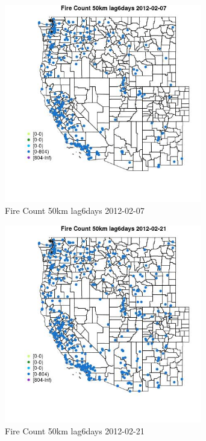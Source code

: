 \begin{figure} 
\centering  
\includegraphics[width=0.77\textwidth]{Code_Outputs/Report_ML_input_PM25_Step4_part_f_de_duplicated_aves_prioritize_24hr_obswNAs_MapObsFire_Count_50km_lag6days2012-02-07.jpg} 
\caption{\label{fig:Report_ML_input_PM25_Step4_part_f_de_duplicated_aves_prioritize_24hr_obswNAsMapObsFire_Count_50km_lag6days2012-02-07}Fire Count 50km lag6days 2012-02-07} 
\end{figure} 
 

\begin{figure} 
\centering  
\includegraphics[width=0.77\textwidth]{Code_Outputs/Report_ML_input_PM25_Step4_part_f_de_duplicated_aves_prioritize_24hr_obswNAs_MapObsFire_Count_50km_lag6days2012-02-21.jpg} 
\caption{\label{fig:Report_ML_input_PM25_Step4_part_f_de_duplicated_aves_prioritize_24hr_obswNAsMapObsFire_Count_50km_lag6days2012-02-21}Fire Count 50km lag6days 2012-02-21} 
\end{figure} 
 

